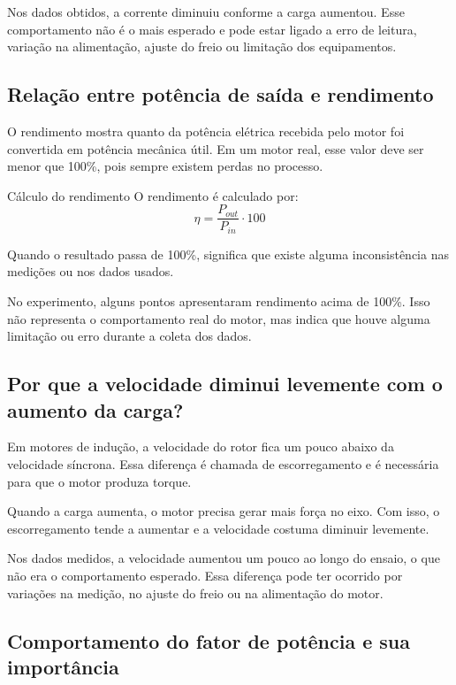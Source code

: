 \documentclass[12pt,a4paper]{article}
\begin{document}
Nos dados obtidos, a corrente diminuiu conforme a carga aumentou. Esse comportamento não é o mais esperado e pode estar ligado a erro de leitura, variação na alimentação, ajuste do freio ou limitação dos equipamentos.

\subsection{Relação entre potência de saída e rendimento}

O rendimento mostra quanto da potência elétrica recebida pelo motor foi convertida em potência mecânica útil. Em um motor real, esse valor deve ser menor que 100\%, pois sempre existem perdas no processo.

\begin{caixacalculo}{Cálculo do rendimento}
O rendimento é calculado por:
\begin{equation*}
\eta=\frac{P_{out}}{P_{in}}\cdot100
\end{equation*}

Quando o resultado passa de 100\%, significa que existe alguma inconsistência nas medições ou nos dados usados.
\end{caixacalculo}

No experimento, alguns pontos apresentaram rendimento acima de 100\%. Isso não representa o comportamento real do motor, mas indica que houve alguma limitação ou erro durante a coleta dos dados.

\subsection{Por que a velocidade diminui levemente com o aumento da carga?}

Em motores de indução, a velocidade do rotor fica um pouco abaixo da velocidade síncrona. Essa diferença é chamada de escorregamento e é necessária para que o motor produza torque.

Quando a carga aumenta, o motor precisa gerar mais força no eixo. Com isso, o escorregamento tende a aumentar e a velocidade costuma diminuir levemente.

Nos dados medidos, a velocidade aumentou um pouco ao longo do ensaio, o que não era o comportamento esperado. Essa diferença pode ter ocorrido por variações na medição, no ajuste do freio ou na alimentação do motor.

\subsection{Comportamento do fator de potência e sua importância}
\end{document}
